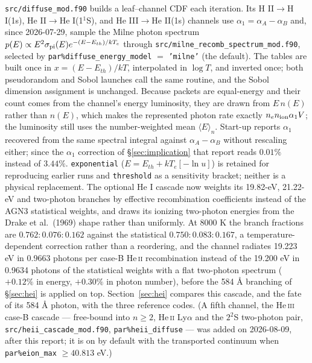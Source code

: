 \documentclass[11pt]{my_memo}
\begin{document}
\texttt{src/diffuse\_mod.f90} builds a leaf--channel CDF each iteration.  Its H II$\to$H I(1s), He II$\to$He I(1$^1$S), and He III$\to$He II(1s) channels use $\alpha_1=\alpha_A-\alpha_B$ and, since 2026-07-29, sample the Milne photon spectrum $p(E)\propto E^2\sigma_{\rm pi}(E)e^{-(E-E_{th})/kT_e}$ through \texttt{src/milne\_\allowbreak recomb\_\allowbreak spectrum\_\allowbreak mod.f90}, selected by \texttt{par\%diffuse\_\allowbreak energy\_\allowbreak model} $=$ \texttt{'milne'} (the default).  The tables are built once in $x=(E-E_{th})/kT$, interpolated in $\log T$, and inverted once; both pseudorandom and Sobol launches call the same routine, and the Sobol dimension assignment is unchanged.  Because packets are equal-energy and their count comes from the channel's energy luminosity, they are drawn from $E\,n(E)$ rather than $n(E)$, which makes the represented photon rate exactly $n_en_{\rm ion}\alpha_1V$; the luminosity still uses the number-weighted mean $\langle E\rangle_n$.  Start-up reports $\alpha_1$ recovered from the same spectral integral against $\alpha_A-\alpha_B$ without rescaling either; since the $\alpha_1$ correction of \S\ref{sec:implication} that report reads $0.01\%$ instead of $3.44\%$.  \texttt{exponential} ($E=E_{th}+kT_e[-\ln u]$) is retained for reproducing earlier runs and \texttt{threshold} as a sensitivity bracket; neither is a physical replacement.  The optional He I cascade now weights its 19.82-eV, 21.22-eV and two-photon branches by effective recombination coefficients instead of the AGN3 statistical weights, and draws its ionizing two-photon energies from the Drake et al.\ (1969) shape rather than uniformly.  At 8000 K the branch fractions are $0.762:0.076:0.162$ against the statistical $0.750:0.083:0.167$, a temperature-dependent correction rather than a reordering, and the channel radiates 19.223 eV in 0.9663 photons per case-B He\,\textsc{ii} recombination instead of the 19.200 eV in 0.9634 photons of the statistical weights with a flat two-photon spectrum ($+0.12\%$ in energy, $+0.30\%$ in photon number), before the 584 \AA{} branching of \S\ref{sec:hei} is applied on top.  Section~\ref{sec:hei} compares this cascade, and the fate of its 584 \AA{} photon, with the three reference codes.  (A fifth channel, the He\,\textsc{iii} case-B cascade --- free-bound into $n\ge2$, He\,\textsc{ii} Ly$\alpha$ and the $2^2$S two-photon pair, \texttt{src/heii\_\allowbreak cascade\_\allowbreak mod.f90}, \texttt{par\%heii\_diffuse} --- was added on 2026-08-09, after this report; it is on by default with the transported continuum when \texttt{par\%eion\_max} $\ge 40.813$ eV.)
\end{document}
